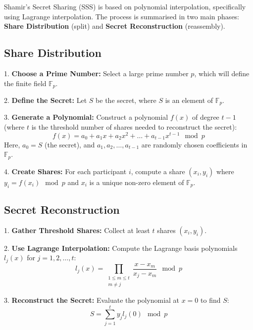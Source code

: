 \documentclass{tufte-handout}
\begin{document}
Shamir's Secret Sharing (SSS) is based on polynomial interpolation, specifically using Lagrange interpolation. The process is summarised
in two main phases: \textbf{Share Distribution} (split) and \textbf{Secret Reconstruction} (reassembly).

\subsection*{Share Distribution}

1. \textbf{Choose a Prime Number:} Select a large prime number \( p \), which will define the finite field \( \mathbb{F}_p \).

2. \textbf{Define the Secret:} Let \( S \) be the secret, where \( S \) is an element of \( \mathbb{F}_p \).

3. \textbf{Generate a Polynomial:} Construct a polynomial \( f(x) \) of degree \( t-1 \) (where \( t \) is the threshold number of shares needed to reconstruct the secret):
   \[
   f(x) = a_0 + a_1x + a_2x^2 + \ldots + a_{t-1}x^{t-1} \mod p
   \]
   Here, \( a_0 = S \) (the secret), and \( a_1, a_2, \ldots, a_{t-1} \) are randomly chosen coefficients in \( \mathbb{F}_p \).

4. \textbf{Create Shares:} For each participant \( i \), compute a share \( (x_i, y_i) \) where \( y_i = f(x_i) \mod p \) and \( x_i \) is a unique non-zero element of \( \mathbb{F}_p \).

\subsection*{Secret Reconstruction}

1. \textbf{Gather Threshold Shares:} Collect at least \( t \) shares \( (x_i, y_i) \).

2. \textbf{Use Lagrange Interpolation:} Compute the Lagrange basis polynomials \( l_j(x) \) for \( j = 1, 2, \ldots, t \):
   \[
   l_j(x) = \prod_{\substack{1 \leq m \leq t \\ m \neq j}} \frac{x - x_m}{x_j - x_m} \mod p
   \]

3. \textbf{Reconstruct the Secret:} Evaluate the polynomial at \( x = 0 \) to find \( S \):
   \[
   S = \sum_{j=1}^t y_j l_j(0) \mod p
   \]
\end{document}
